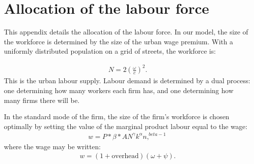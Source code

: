 \documentclass[]{article}
\begin{document}
 
\section{Allocation of the labour force} \label{appendix-Allocation_of_labour}

This appendix details the allocation of the labour force. In our model, the size of the workforce is determined by the size of the urban wage premium. With a uniformly distributed population on a grid of streets, the workforce is:
    
\begin{align}\label{eqn:N}
N=2\left(\frac{\omega}{c}\right)^2.    
\end{align}
This is the urban labour supply. Labour demand is determined by a dual process: one determining how many workers each firm has, and one determining how many firms there will be. 

In the standard mode of the firm, the size of the firm's workforce is chosen optimally by setting the value of the marginal product labour equal to the wage:
\begin{align}\label{eqn:opt}
w = P*\beta*AN^\gamma k^\alpha n,^{beta-1}
\end{align}
where the wage may be  written: 
\begin{align}\label{eqn:w}
w=(1 + \text{overhead})(\omega + \psi).
\end{align}
\end{document}
